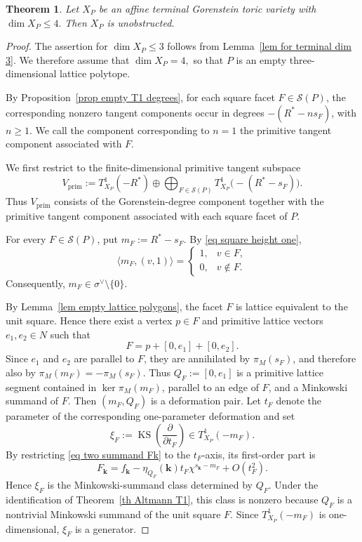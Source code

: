 \documentclass[11pt]{amsart}
\numberwithin{equation}{section}
\theoremstyle{plain}
\newtheorem{theorem}{Theorem}[section]
\theoremstyle{definition}
\newcommand{\0}{$0$-mutable}
\renewcommand{\1}{$1$-rigid}
\renewcommand{\0}{$0$-mutable}
\newcommand{\KS}{\operatorname{KS}}
\begin{document}
\begin{theorem}
\label{th term un}
\label{cor terminal Gorenstein unobstructed}
Let \(X_P\) be an affine terminal Gorenstein toric variety with
$
\dim X_P\leq4.
$
Then \(X_P\) is unobstructed.
\end{theorem}







\begin{proof}
The assertion for \(\dim X_P\leq3\) follows from
Lemma~\ref{lem for terminal dim 3}. We therefore assume that
$
\dim X_P=4,
$
so that \(P\) is an empty three-dimensional lattice polytope.

{
By Proposition~\ref{prop empty T1 degrees}, for each square facet
\(F\in\mathcal S(P)\), the corresponding nonzero tangent components
occur in degrees \(-(R^*-ns_F)\), with \(n\geq 1\). We call the
component corresponding to \(n=1\) the primitive tangent component
associated with \(F\). 

We first restrict to the finite-dimensional primitive tangent
subspace
\[
V_{\mathrm{prim}}
:=
T^1_{X_P}(-R^*)
\oplus
\bigoplus_{F\in\mathcal S(P)}
T^1_{X_P}\bigl(-(R^*-s_F)\bigr).
\]
Thus \(V_{\mathrm{prim}}\) consists of the Gorenstein-degree component
together with the primitive tangent component associated with each
square facet of \(P\).
}



For every \(F\in\mathcal S(P)\), put
$
m_F:=R^*-s_F.
$
By \eqref{eq square height one},
\[
\langle m_F,(v,1)\rangle
=
\begin{cases}
1, & v\in F,\\
0, & v\notin F.
\end{cases}
\]
Consequently,
$
m_F\in\sigma^\vee\setminus\{0\}.
$

{By Lemma~\ref{lem empty lattice polygons}, the facet \(F\) is lattice
equivalent to the unit square. Hence there exist a vertex \(p\in F\)
and primitive lattice vectors \(e_1,e_2\in N\) such that
\[
F=p+[0,e_1]+[0,e_2].
\]
Since \(e_1\) and \(e_2\) are parallel to \(F\), they are annihilated
by \(\pi_M(s_F)\), and therefore also by
\(\pi_M(m_F)=-\pi_M(s_F)\). Thus
\(Q_F:=[0,e_1]\) is a primitive lattice segment contained in
\(\ker\pi_M(m_F)\), parallel to an edge of \(F\), and a Minkowski
summand of \(F\).}
Then \((m_F,Q_F)\) is a deformation pair.  Let \(t_F\) denote
the parameter of the corresponding one-parameter deformation and set
\[
\xi_F
:=
\KS\left(\frac{\partial}{\partial t_F}\right)
\in
T^1_{X_P}(-m_F).
\]
{
By restricting \eqref{eq two summand Fk} to the
\(t_F\)-axis, its first-order part is
\[
F_{\mathbf k}
=
f_{\mathbf k}
-
\eta_{Q_F}(\mathbf k)t_F
\chi^{s_{\mathbf k}-m_F}
+
O(t_F^2).
\]
Hence \(\xi_F\) is the Minkowski-summand class determined by \(Q_F\).
Under the identification of Theorem~\ref{th Altmann T1}, this class is
nonzero because \(Q_F\) is a nontrivial Minkowski summand of the unit
square \(F\). Since \(T^1_{X_P}(-m_F)\) is one-dimensional,
\(\xi_F\) is a generator.}


\end{proof}
\end{document}
